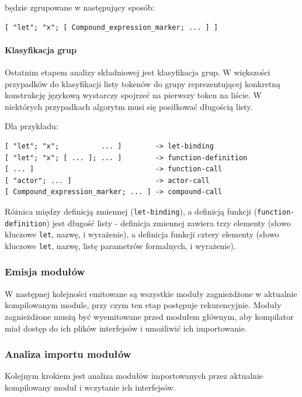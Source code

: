 \documentclass[11pt,oneside,a4paper,titlepage,onecolumn]{article}
\begin{document}
będzie zgrupowane w następujący sposób:

\begin{lstlisting}
[ "let"; "x"; [ Compound_expression_marker; ... ] ]
\end{lstlisting}

\paragraph{Klasyfikacja grup}

Ostatnim etapem analizy składniowej jest klasyfikacja grup. W większości przypadków do klasyfikacji listy
tokenów do grupy reprezentującej konkretną konstrukcję językową wystarczy spojrzeć na pierwszy token na
liście. W niektórych przypadkach algorytm musi się posiłkować długością listy.

Dla przykładu:

\begin{lstlisting}
[ "let"; "x";          ... ]        -> let-binding
[ "let"; "x"; [ ... ]; ... ]        -> function-definition
[ ... ]                             -> function-call
[ "actor"; ... ]                    -> actor-call
[ Compound_expression_marker; ... ] -> compound-call
\end{lstlisting}

Różnica między definicją zmiennej (\texttt{let-binding}), a definicją funkcji (\texttt{function-definition})
jest długość listy - definicja zmiennej zawiera trzy elementy (słowo kluczowe \texttt{let}, nazwę, i
wyrażenie), a definicja funkcji cztery elementy (słowo kluczowe \texttt{let}, nazwę, listę parametrów
formalnych, i wyrażenie).

\subsubsection{Emisja modułów}

W następnej kolejności emitowane są wszystkie moduły zagnieżdżone w aktualnie kompilowanym module, przy czym
ten etap postępuje rekurencyjnie. Moduły zagnieżdżone musżą być wyemitowane przed modułem głównym, aby
kompilator miał dostęp do ich plików interfejsów i umożliwić ich importowanie.

\subsubsection{Analiza importu modułów}

Kolejnym krokiem jest analiza modułów importowanych przez aktualnie kompilowany moduł i wczytanie ich
interfejsów.
\end{document}
